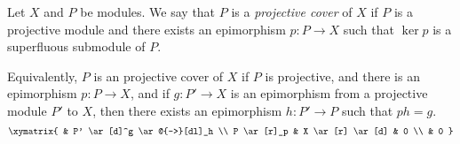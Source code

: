 \documentclass[12pt]{article}
\begin{document}
Let $X$ and $P$ be modules.
We say that $P$ is a {\it projective cover} of $X$
if $P$ is a projective module
and there exists an epimorphism $p \colon P \to X$
such that $\operatorname{ker} p$ is a superfluous submodule of $P$.

Equivalently, $P$ is an projective cover of $X$
if $P$ is projective,
and there is an epimorphism $p \colon P \to X$,
and if $g \colon P' \to X$ is an epimorphism
from a projective module $P'$ to $X$,
then there exists an epimorphism $h \colon P' \to P$
such that $ph = g$.
$$
\xymatrix{
  &
  P'
        \ar[d]^g
        \ar@{-->}[dl]_h
  \\
  P
        \ar[r]_p
  &
  X
        \ar[r]
        \ar[d]
  &
  0
  \\
  &
  0
}
$$
\end{document}
